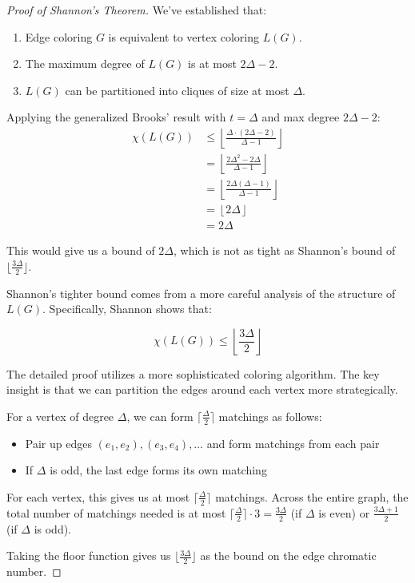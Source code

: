 \documentclass{article}
\theoremstyle{definition}
\begin{document}
\begin{proof}[Proof of Shannon's Theorem]
We've established that:
\begin{enumerate}
    \item Edge coloring $G$ is equivalent to vertex coloring $L(G)$.
    \item The maximum degree of $L(G)$ is at most $2\Delta - 2$.
    \item $L(G)$ can be partitioned into cliques of size at most $\Delta$.
\end{enumerate}

Applying the generalized Brooks' result with $t = \Delta$ and max degree $2\Delta - 2$:
\begin{align}
\chi(L(G)) &\leq \left\lfloor\frac{\Delta \cdot (2\Delta - 2)}{\Delta - 1}\right\rfloor \\
&= \left\lfloor\frac{2\Delta^2 - 2\Delta}{\Delta - 1}\right\rfloor \\
&= \left\lfloor\frac{2\Delta(\Delta - 1)}{\Delta - 1}\right\rfloor \\
&= \left\lfloor 2\Delta \right\rfloor \\
&= 2\Delta
\end{align}

This would give us a bound of $2\Delta$, which is not as tight as Shannon's bound of $\lfloor \frac{3\Delta}{2} \rfloor$.

Shannon's tighter bound comes from a more careful analysis of the structure of $L(G)$. Specifically, Shannon shows that:

\begin{equation}
\chi(L(G)) \leq \left\lfloor\frac{3\Delta}{2}\right\rfloor
\end{equation}

The detailed proof utilizes a more sophisticated coloring algorithm. The key insight is that we can partition the edges around each vertex more strategically.

For a vertex of degree $\Delta$, we can form $\lceil \frac{\Delta}{2} \rceil$ matchings as follows:
\begin{itemize}
    \item Pair up edges $(e_1, e_2), (e_3, e_4), \ldots$ and form matchings from each pair
    \item If $\Delta$ is odd, the last edge forms its own matching
\end{itemize}

For each vertex, this gives us at most $\lceil \frac{\Delta}{2} \rceil$ matchings. Across the entire graph, the total number of matchings needed is at most $\lceil \frac{\Delta}{2} \rceil \cdot 3 = \frac{3\Delta}{2}$ (if $\Delta$ is even) or $\frac{3\Delta+1}{2}$ (if $\Delta$ is odd).

Taking the floor function gives us $\lfloor \frac{3\Delta}{2} \rfloor$ as the bound on the edge chromatic number.
\end{proof}
\end{document}
